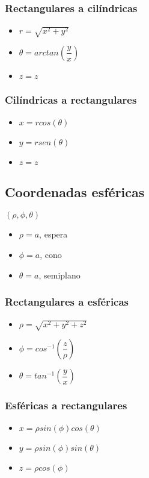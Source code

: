 \subsubsection{Rectangulares a cilíndricas}
\begin{itemize}
	\item $r=\sqrt{x^2+y^2}$
	\item $\theta=arctan(\dfrac{y}{x})$
	\item $z=z$
\end{itemize}

\subsubsection{Cilíndricas a rectangulares}
\begin{itemize}
	\item $x=rcos(\theta)$
	\item $y=rsen(\theta)$
	\item $z=z$
\end{itemize}

\subsection{Coordenadas esféricas}
$(\rho, \phi,\theta)$

\begin{itemize}
	\item $\rho=a$, espera
	\item $\phi=a$, cono
	\item $\theta=a$, semiplano
\end{itemize}

\subsubsection{Rectangulares a esféricas}
\begin{itemize}
	\item $\rho=\sqrt{x^2+y^2+z^2}$
	\item $\phi=cos^{-1}(\dfrac{z}{\rho})$
	\item $\theta=tan^{-1}(\dfrac{y}{x})$
\end{itemize}

\subsubsection{Esféricas a rectangulares}
\begin{itemize}
	\item $x=\rho sin(\phi) cos(\theta)$
	\item $y=\rho sin(\phi) sin(\theta)$
	\item $z=\rho cos(\phi)$
\end{itemize}

